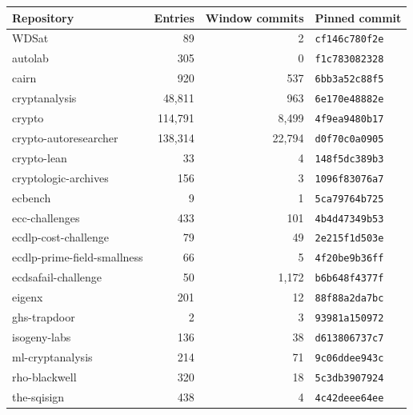 \begin{longtable}{@{}p{3.5cm}r r p{3.1cm}@{}}
\toprule Repository & Entries & Window commits & Pinned commit \\
\midrule\endhead
WDSat & 89 & 2 & \texttt{cf146c780f2e} \\
autolab & 305 & 0 & \texttt{f1c783082328} \\
cairn & 920 & 537 & \texttt{6bb3a52c88f5} \\
cryptanalysis & 48,811 & 963 & \texttt{6e170e48882e} \\
crypto & 114,791 & 8,499 & \texttt{4f9ea9480b17} \\
crypto-autoresearcher & 138,314 & 22,794 & \texttt{d0f70c0a0905} \\
crypto-lean & 33 & 4 & \texttt{148f5dc389b3} \\
cryptologic-archives & 156 & 3 & \texttt{1096f83076a7} \\
ecbench & 9 & 1 & \texttt{5ca79764b725} \\
ecc-challenges & 433 & 101 & \texttt{4b4d47349b53} \\
ecdlp-cost-challenge & 79 & 49 & \texttt{2e215f1d503e} \\
ecdlp-prime-field-smallness & 66 & 5 & \texttt{4f20be9b36ff} \\
ecdsafail-challenge & 50 & 1,172 & \texttt{b6b648f4377f} \\
eigenx & 201 & 12 & \texttt{88f88a2da7bc} \\
ghs-trapdoor & 2 & 3 & \texttt{93981a150972} \\
isogeny-labs & 136 & 38 & \texttt{d613806737c7} \\
ml-cryptanalysis & 214 & 71 & \texttt{9c06ddee943c} \\
rho-blackwell & 320 & 18 & \texttt{5c3db3907924} \\
the-sqisign & 438 & 4 & \texttt{4c42deee64ee} \\
\bottomrule\end{longtable}
